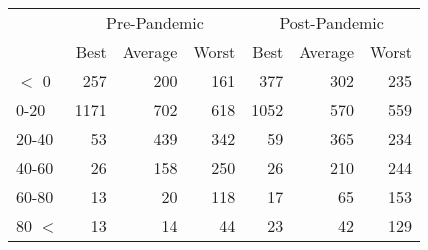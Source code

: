 
\begin{tabular}[t]{lrrrrrr}
\toprule
\multicolumn{1}{c}{ } & \multicolumn{3}{c}{Pre-Pandemic} & \multicolumn{3}{c}{Post-Pandemic} \\
\cmidrule(l{3pt}r{3pt}){2-4} \cmidrule(l{3pt}r{3pt}){5-7}
 & Best & Average & Worst & Best & Average & Worst\\
\midrule
$<$ 0 & 257 & 200 & 161 & 377 & 302 & 235\\
0-20 & 1171 & 702 & 618 & 1052 & 570 & 559\\
20-40 & 53 & 439 & 342 & 59 & 365 & 234\\
40-60 & 26 & 158 & 250 & 26 & 210 & 244\\
60-80 & 13 & 20 & 118 & 17 & 65 & 153\\
80 $<$ & 13 & 14 & 44 & 23 & 42 & 129\\
\bottomrule
\end{tabular}
